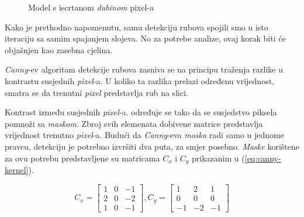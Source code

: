 \begin{figure}[H]
\centering{}
\caption{Model s iscrtanom \emph{dubinom} pixel-a}
\label{fig:monkey-depth}
\end{figure}

Kako je prethodno napomenutu, samu detekciju rubova spojili smo u isto iteraciju sa samim spajanjem slojeva. No za potrebe analize, ovaj korak biti će objašnjen kao zasebna cjelina.

\emph{Canny}-ev algoritam detekcije rubova\cite{opencv-canny} zasniva se na principu traženja razlike u kontrastu susjednih \emph{pixel}-a. U koliko ta razlika prelazi određenu vrijednost, smatra se da trenutni \emph{pixel} predstavlja rub na slici.

Kontrast između susjednih \emph{pixel}-a. određuje se tako da se susjedstvo piksela pomnoži sa \emph{maskom}. Zbroj svih elemenata dobivene matrice predstavlja vrijednost trenutno \emph{pixel}-a. Budući da \emph{Canny}-eva \emph{maska} radi samo u jednome pravcu, detekciju je potrebno izvršiti dva puta, za smjer posebno. \emph{Maske} korištene za ovu potrebu predstavljene su matricama $C_x$ i $C_y$ prikazanim u (\ref{eq:canny-kernel}).

\begin{equation}
\label{eq:canny-kernel}
	C_x = 
	\begin{bmatrix}
		1 & 0 & -1\\
		2 & 0 & -2\\
		1 & 0 & -1
	\end{bmatrix},
	C_y = 
	\begin{bmatrix}
		1 & 2 & 1\\
		0 & 0 & 0\\
		-1 & -2 & -1
	\end{bmatrix}
\end{equation}

